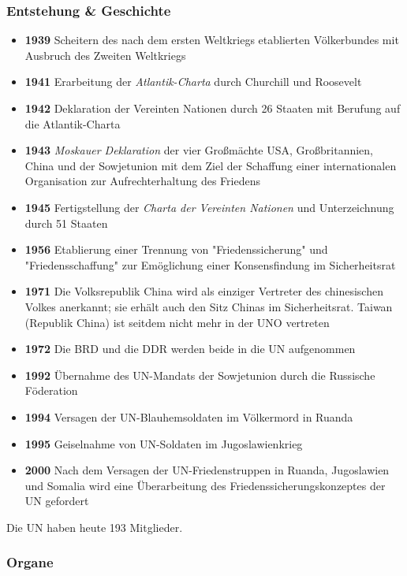 \documentclass{article}
\begin{document}
	\subsubsection{Entstehung \& Geschichte}
	\begin{itemize}
		\item \textbf{1939} Scheitern des nach dem ersten Weltkriegs etablierten Völkerbundes mit Ausbruch des Zweiten Weltkriegs
		\item \textbf{1941} Erarbeitung der \textit{Atlantik-Charta} durch Churchill und Roosevelt
		\item \textbf{1942} Deklaration der Vereinten Nationen durch 26 Staaten mit Berufung auf die Atlantik-Charta
		\item \textbf{1943} \textit{Moskauer Deklaration} der vier Großmächte USA, Großbritannien, China und der Sowjetunion mit dem  Ziel der Schaffung einer internationalen Organisation zur Aufrechterhaltung des Friedens
		\item \textbf{1945} Fertigstellung der \textit{Charta der Vereinten Nationen} und Unterzeichnung durch 51 Staaten
		\item \textbf{1956} Etablierung einer Trennung von "Friedenssicherung" und "Friedensschaffung" zur Emöglichung einer Konsensfindung im Sicherheitsrat
		\item \textbf{1971} Die Volksrepublik China wird als einziger Vertreter des chinesischen Volkes anerkannt; sie erhält auch den Sitz Chinas im Sicherheitsrat. Taiwan (Republik China) ist seitdem nicht mehr in der UNO vertreten
		\item \textbf{1972} Die BRD und die DDR werden beide in die UN aufgenommen
		\item \textbf{1992} Übernahme des UN-Mandats der Sowjetunion durch die Russische Föderation
		\item \textbf{1994} Versagen der UN-Blauhemsoldaten im Völkermord in Ruanda
		\item \textbf{1995} Geiselnahme von UN-Soldaten im Jugoslawienkrieg
		\item \textbf{2000} Nach dem Versagen der UN-Friedenstruppen in Ruanda, Jugoslawien und Somalia wird eine Überarbeitung des Friedenssicherungskonzeptes der UN gefordert
	\end{itemize}

	Die UN haben heute 193 Mitglieder.

	\subsubsection{Organe}
\end{document}
